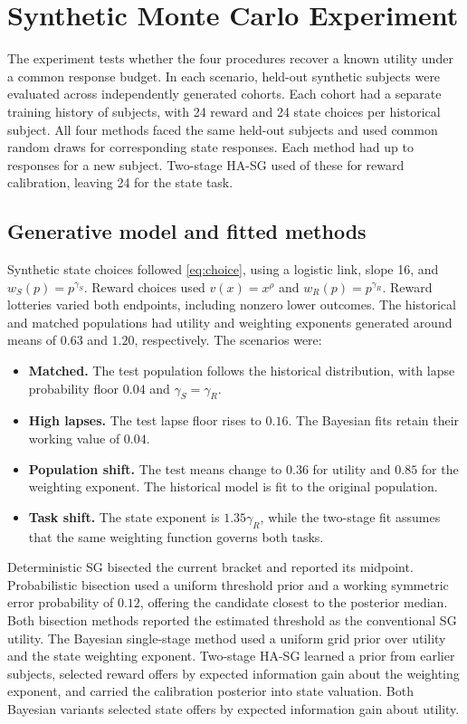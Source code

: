 \documentclass[11pt,a4paper]{article}
\begin{document}
\section{Synthetic Monte Carlo Experiment}
\label{sec:simulation}

The experiment tests whether the four procedures recover a known utility under a common response budget. In each scenario, \SimN{} held-out synthetic subjects were evaluated across \SimCohorts{} independently generated cohorts. Each cohort had a separate training history of \SimHistory{} subjects, with 24 reward and 24 state choices per historical subject. All four methods faced the same held-out subjects and used common random draws for corresponding state responses. Each method had up to \SimBudget{} responses for a new subject. Two-stage HA-SG used \SimCalibration{} of these for reward calibration, leaving 24 for the state task.

\subsection{Generative model and fitted methods}

Synthetic state choices followed \cref{eq:choice}, using a logistic link, slope 16, and $w_S(p)=p^{\gamma_S}$. Reward choices used $v(x)=x^\rho$ and $w_R(p)=p^{\gamma_R}$. Reward lotteries varied both endpoints, including nonzero lower outcomes. The historical and matched populations had utility and weighting exponents generated around means of $0.63$ and $1.20$, respectively. The scenarios were:
\begin{itemize}[leftmargin=*]
  \item \textbf{Matched.} The test population follows the historical distribution, with lapse probability floor $0.04$ and $\gamma_S=\gamma_R$.
  \item \textbf{High lapses.} The test lapse floor rises to $0.16$. The Bayesian fits retain their working value of $0.04$.
  \item \textbf{Population shift.} The test means change to $0.36$ for utility and $0.85$ for the weighting exponent. The historical model is fit to the original population.
  \item \textbf{Task shift.} The state exponent is $1.35\gamma_R$, while the two-stage fit assumes that the same weighting function governs both tasks.
\end{itemize}

Deterministic SG bisected the current bracket and reported its midpoint. Probabilistic bisection used a uniform threshold prior and a working symmetric error probability of $0.12$, offering the candidate closest to the posterior median. Both bisection methods reported the estimated threshold as the conventional SG utility. The Bayesian single-stage method used a uniform grid prior over utility and the state weighting exponent. Two-stage HA-SG learned a prior from earlier subjects, selected reward offers by expected information gain about the weighting exponent, and carried the calibration posterior into state valuation. Both Bayesian variants selected state offers by expected information gain about utility.
\end{document}

